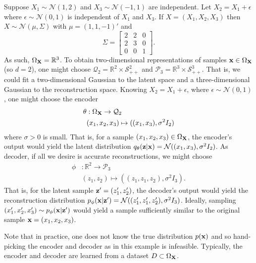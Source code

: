 \documentclass[11pt]{article}
\begin{document}
\begin{tcolorbox}[title={\centering\textbf{VAE example}}, colback=myLightBlue, colbacktitle=myDarkBlue, colframe=myDarkBlue, coltitle=white]
    Suppose $X_1\sim\mathcal{N}(1,2)$ and $X_3\sim\mathcal{N}(-1,1)$ are independent. Let $X_2=X_1+\epsilon$ where $\epsilon\sim\mathcal{N}(0,1)$ is independent of $X_1$ and $X_3$. If $X=(X_1,X_2,X_3)$ then $X\sim\mathcal{N}(\mu,\Sigma)$ with $\mu=(1,1,-1)'$ and
    $$
    \Sigma
    =
    \begin{bmatrix}
        2 & 2 & 0\\
        2 & 3 & 0\\
        0 & 0 & 1
    \end{bmatrix}.
    $$
    As such, $\Omega_{\mathbf{X}}=\mathbb{R}^3$. To obtain two-dimensional representations of samples $\mathbf{x}\in\Omega_{\mathbf{X}}$ (so $d=2$), one might choose $\mathcal{Q}_2=\mathbb{R}^2\times\mathcal{S}_{++}^2$ and $\mathcal{P}_3=\mathbb{R}^3\times\mathcal{S}_{++}^3$. That is, we could fit a two-dimensional Gaussian to the latent space and a three-dimensional Gaussian to the reconstruction space. Knowing $X_2=X_1+\epsilon$, where $\epsilon\sim\mathcal{N}(0,1)$, one might choose the encoder
    \begin{align*}
        \theta&:
        \Omega_{\mathbf{X}}\to\mathcal{Q}_2\\
        &(x_1,x_2,x_3)\mapsto((x_1,x_3),\sigma^2I_2)
    \end{align*}
    where $\sigma>0$ is small. That is, for a sample $(x_1,x_2,x_3)\in\Omega_{\mathbf{X}}$, the encoder's output would yield the latent distribution $q_{\theta}(\mathbf{z}|\mathbf{x})=\mathcal{N}((x_1,x_3),\sigma^2I_2)$. As decoder, if all we desire is accurate reconstructions, we might choose
    \begin{align*}
        \phi&:
        \mathbb{R}^2\to\mathcal{P}_3\\
        &(z_1,z_2)\mapsto((z_1,z_1,z_2), \sigma^2I_3).
    \end{align*}
    That is, for the latent sample $\mathbf{z}'=(z_1',z_2')$, the decoder's output would yield the reconstruction distribution $p_{\phi}(\mathbf{x}|\mathbf{z}')=\mathcal{N}((z_1',z_1',z_2'),\sigma^2I_3)$. Ideally, sampling $(x_1',x_2',x_3')\sim p_{\phi}(\mathbf{x}|\mathbf{z}')$ would yield a sample sufficiently similar to the original sample $\mathbf{x}=(x_1,x_2,x_3)$.

    \hspace{15pt} Note that in practice, one does not know the true distribution $p(\mathbf{x})$ and so hand-picking the encoder and decoder as in this example is infeasible. Typically, the encoder and decoder are learned from a dataset $D\subset\Omega_{\mathbf{X}}$.
\end{tcolorbox}
\end{document}
